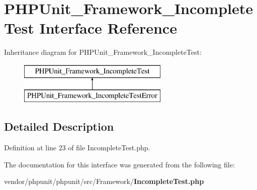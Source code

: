 \section{P\+H\+P\+Unit\+\_\+\+Framework\+\_\+\+Incomplete\+Test Interface Reference}
\label{interface_p_h_p_unit___framework___incomplete_test}
Inheritance diagram for P\+H\+P\+Unit\+\_\+\+Framework\+\_\+\+Incomplete\+Test\+:\begin{figure}[H]
\begin{center}
\leavevmode
\includegraphics[height=2.000000cm]{interface_p_h_p_unit___framework___incomplete_test}
\end{center}
\end{figure}


\subsection{Detailed Description}


Definition at line 23 of file Incomplete\+Test.\+php.



The documentation for this interface was generated from the following file\+:\begin{DoxyCompactItemize}
\item 
vendor/phpunit/phpunit/src/\+Framework/{\bf Incomplete\+Test.\+php}\end{DoxyCompactItemize}
